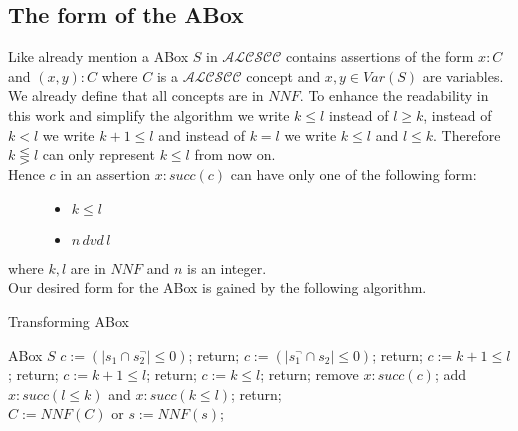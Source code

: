 \documentclass[a4paper,11pt]{scrartcl}
\theoremstyle{break}
\theoremstyle{definition}
\begin{document}
\subsection{The form of the ABox}
Like already mention a ABox $S$ in $\mathcal{ALCSCC}$ contains assertions of the form $x:C$ and $(x,y):C$ where $C$ is a $\mathcal{ALCSCC}$ concept and $x,y\in Var(S)$ are variables. We already define that all concepts are in $NNF$. To enhance the readability in this work and simplify the algorithm we write $k\leq l$ instead of $l\geq k$, instead of $k<l$ we write $k+1\leq l$ and instead of $k=l$ we write $k\leq l$ and $l\leq k$. Therefore $k\lesseqgtr l$ can only represent $k\leq l$ from now on. \\
Hence $c$ in an assertion $x:succ(c)$ can have only one of the following form:
\begin{figure}[H]
\begin{minipage}[t]{.5\textwidth}
\raggedright
\begin{itemize}
\item $k\leq l$
\end{itemize}
\end{minipage}%
\begin{minipage}[t]{.5\textwidth}
\raggedleft
\begin{itemize}
\item $n\,dvd\, l$
\end{itemize}
\end{minipage}
\end{figure}
where $k,l$ are in $NNF$ and $n$ is an integer.\\
Our desired form for the ABox is gained by the following algorithm.
\begin{algorithm}[H] \caption{Transforming ABox}
\begin{algorithmic}[l]
\State ABox $S$
\State $c:=(|s_1\cap s_2^\neg|\leq 0)$; return;
\EndIf
{}
\State $c:=(|s_1^\neg\cap s_2|\leq 0)$; return;
\EndIf
{}
\State $c:=k +1\leq l$; return;
\EndIf
{}
\State $c:=k +1\leq l$; return;
\EndIf
{}
\State $c:=k\leq l$; return;
\EndIf
{}
\State remove $x:succ(c)$;
\State add $x:succ(l\leq k)$ and $x:succ(k\leq l)$; return;
\EndIf
\EndFor\\
\State $C:=NNF(C)$ or $s:=NNF(s)$;
\EndFor
\end{algorithmic}
\end{algorithm}
\end{document}
